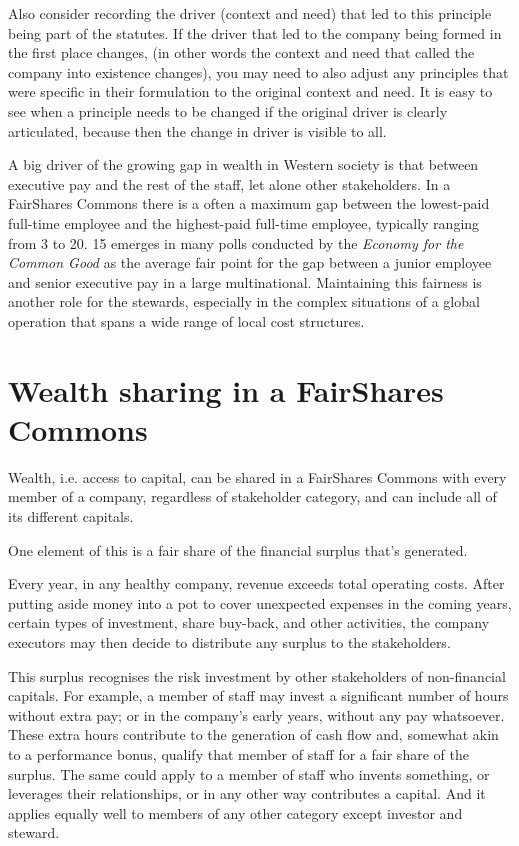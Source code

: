 Also consider recording the driver (context and need) that led to this principle being part of the statutes. If the driver that led to the company being formed in the first place changes, (in other words the context and need that called the company into existence changes), you may need to also adjust any principles that were specific in their formulation to the original context and need. It is easy to see when a principle needs to be changed if the original driver is clearly articulated, because then the change in driver is visible to all.


A big driver of the growing gap in wealth in Western society is that between executive pay and the rest of the staff, let alone other stakeholders. In a FairShares Commons there is a often a maximum gap between the lowest-paid full-time employee and the highest-paid full-time employee, typically ranging from 3 to 20. 15 emerges in many polls conducted by the \emph{Economy for the Common Good}\cite{ecg-website} as the average fair point for the gap between a junior employee and senior executive pay in a large multinational. Maintaining this fairness is another role for the stewards, especially in the complex situations of a global operation that spans a wide range of local cost structures.


\section{Wealth sharing in a FairShares Commons}
Wealth, i.e. access to capital, can be shared in a FairShares Commons with every member of a company, regardless of stakeholder category, and can include all of its different capitals.


One element of this is a fair share of the financial surplus that’s generated.


Every year, in any healthy company, revenue exceeds total operating costs. After putting aside money into a pot to cover unexpected expenses in the coming years, certain types of investment, share buy-back, and other activities, the company executors may then decide to distribute any surplus to the stakeholders.


This surplus recognises the risk investment by other stakeholders of non\hyp{}financial capitals. For example, a member of staff may invest a significant number of hours without extra pay; or in the company’s early years, without any pay whatsoever. These extra hours contribute to the generation of cash flow and, somewhat akin to a performance bonus, qualify that member of staff for a fair share of the surplus. The same could apply to a member of staff who invents something, or leverages their relationships, or in any other way contributes a capital. And it applies equally well to members of any other category except investor and steward.


